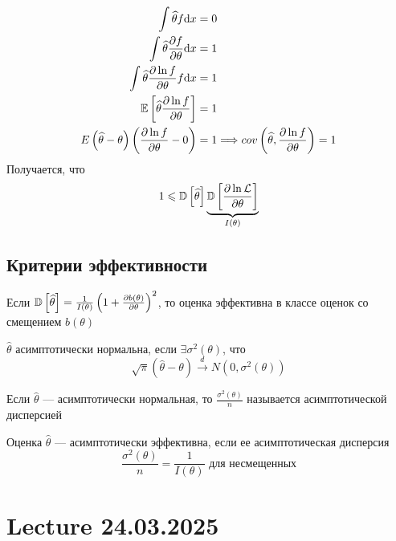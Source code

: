 \documentclass[a4paper, 10pt]{article}
\begin{document}
\begin{equation*}
    \begin{aligned}
        \int\widehat{\theta}f\text{d}x&=0\\
        \int\widehat{\theta}\frac{\partial f}{\partial\theta}\text{d}x&=1\\
        \int\widehat{\theta}\frac{\partial\ln f}{\partial\theta}f\text{d}x&=1\\
        \mathbb{E}\left[\widehat{\theta}\frac{\partial \ln f}{\partial\theta}\right]&=1\\
        E\left(\widehat{\theta}-\theta\right)\left(\frac{\partial \ln f}{\partial\theta}-0\right)&=1\Longrightarrow cov\left(\widehat{\theta},\frac{\partial\ln f}{\partial\theta}\right)=1
    \end{aligned}
\end{equation*}
Получается, что
\begin{equation*}
    1\leqslant\mathbb{D}\left[\widehat{\theta}\right]\underbrace{\mathbb{D}\left[\frac{\partial\ln\mathcal{L}}{\partial\theta}\right]}_{I(\theta)}
\end{equation*}


\subsection{Критерии эффективности}
Если $ \mathbb{D}\left[\widehat{\theta}\right]=\frac{1}{I(\theta)}\left(1+\frac{\partial b(\theta)}{\partial\theta}\right)^2$, то оценка эффективна в классе оценок со смещением $b(\theta)$

 $\widehat{\theta}$ асимптотически нормальна, если $\exists\sigma^2(\theta)$, что 
\begin{equation*}
    \sqrt{\pi}(\widehat{\theta}-\theta)\overset{d}{\longrightarrow} N(0,\sigma^2(\theta))
\end{equation*}

 Если $\widehat{\theta}$ — асимптотически нормальная, то $\frac{\sigma^2(\theta)}{n}$ называется асимптотической дисперсией

 Оценка $\widehat{\theta}$ — асимптотически эффективна, если ее асимптотическая дисперсия 
\begin{equation*}
    \frac{\sigma^2(\theta)}{n}=\frac{1}{I(\theta)}\text{ для несмещенных}
\end{equation*}



\newpage
\section{Lecture 24.03.2025}
\end{document}
